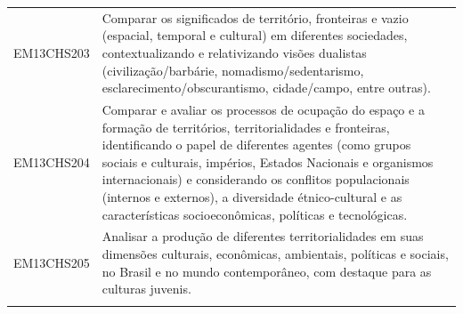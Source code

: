 \documentclass[12pt]{extarticle}
\begin{document}
\begin{longtable}{ll}
EM13CHS203 & Comparar os significados de território, fronteiras e vazio (espacial, temporal e cultural) em diferentes sociedades, contextualizando e relativizando visões dualistas (civilização/barbárie, nomadismo/sedentarismo, esclarecimento/obscurantismo, cidade/campo, entre outras).                                                                                                                                                                                                                                                                                                                                                                                                                                                                                                                                      \\
\rowcolor[HTML]{FFF} 
EM13CHS204 & Comparar e avaliar os processos de ocupação do espaço e a formação de territórios, territorialidades e fronteiras, identificando o papel de diferentes agentes (como grupos sociais e culturais, impérios, Estados Nacionais e organismos internacionais) e considerando os conflitos populacionais (internos e externos), a diversidade étnico-cultural e as características socioeconômicas, políticas e tecnológicas.                                                                                                                                                                                                                                                                                                                                                                                              \\
\rowcolor[HTML]{E0F7FA} 
EM13CHS205 & Analisar a produção de diferentes territorialidades em suas dimensões culturais, econômicas, ambientais, políticas e sociais, no Brasil e no mundo contemporâneo, com destaque para as culturas juvenis.                                                                                                                                                                                                                                                                                                                                                                                                                                                                                                                                                                                                              \\
\rowcolor[HTML]{FFF} 

\end{longtable}
\end{document}
